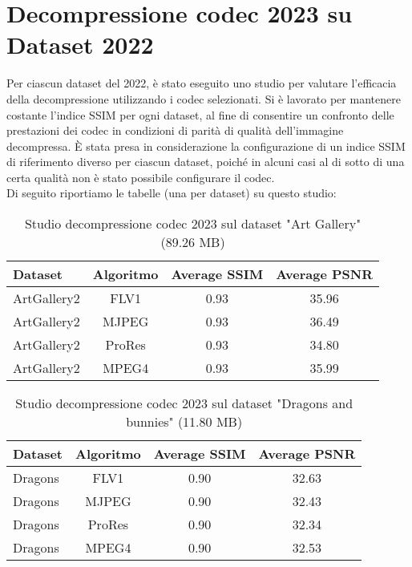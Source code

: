 \clearpage
\section{Decompressione codec 2023 su Dataset 2022}

Per ciascun dataset del 2022, è stato eseguito uno studio per valutare l'efficacia della decompressione utilizzando i codec selezionati. Si è lavorato per mantenere costante l'indice SSIM per ogni dataset, al fine di consentire un confronto delle prestazioni dei codec in condizioni di parità di qualità dell'immagine decompressa. È stata presa in considerazione la configurazione di un indice SSIM di riferimento diverso per ciascun dataset, poiché in alcuni casi al di sotto di una certa qualità non è stato possibile configurare il codec.
\\
Di seguito riportiamo le tabelle (una per dataset) su questo studio:

\begin{table}[ht]
\centering
\begin{tabular}{|l|c|c|c|}
\hline
Dataset               & Algoritmo & Average SSIM & Average PSNR \\ \hline
ArtGallery2           & FLV1      & 0.93        & 35.96       \\ \hline
ArtGallery2           & MJPEG     & 0.93        & 36.49       \\ \hline
ArtGallery2           & ProRes    & 0.93        & 34.80       \\ \hline
ArtGallery2           & MPEG4     & 0.93        & 35.99       \\ \hline
\end{tabular}
\caption{Studio decompressione codec 2023 sul dataset "Art Gallery" (89.26 MB)}
\end{table}

\begin{table}[ht]
\centering
\begin{tabular}{|l|c|c|c|}
\hline
Dataset               & Algoritmo & Average SSIM & Average PSNR \\ \hline
Dragons               & FLV1      & 0.90        & 32.63       \\ \hline
Dragons               & MJPEG     & 0.90        & 32.43       \\ \hline
Dragons               & ProRes    & 0.90        & 32.34       \\ \hline
Dragons               & MPEG4     & 0.90        & 32.53       \\ \hline
\end{tabular}
\caption{Studio decompressione codec 2023 sul dataset "Dragons and bunnies" (11.80 MB)}
\end{table}

